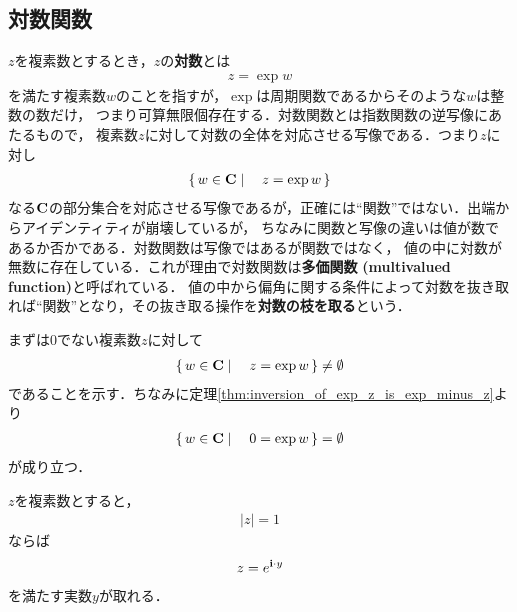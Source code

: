 \subsection{対数関数}
	
	$z$を複素数とするとき，$z$の{\bf 対数}とは
	\begin{align}
		z = \exp{w}
	\end{align}
	を満たす複素数$w$のことを指すが，$\exp$は周期関数であるからそのような$w$は整数の数だけ，
	つまり可算無限個存在する．対数関数とは指数関数の逆写像にあたるもので，
	複素数$z$に対して対数の全体を対応させる写像である．つまり$z$に対し
	\begin{align}
		\left\{\, w \in \mathbf{C} \mid \quad z = \exp{w}\, \right\}
	\end{align}
	なる$\mathbf{C}$の部分集合を対応させる写像であるが，正確には``関数''ではない．出端からアイデンティティが崩壊しているが，
	ちなみに関数と写像の違いは値が数であるか否かである．対数関数は写像ではあるが関数ではなく，
	値の中に対数が無数に存在している．これが理由で対数関数は{\bf 多価関数}
	{\bf (multivalued function)}と呼ばれている．
	値の中から偏角に関する条件によって対数を抜き取れば``関数''となり，その抜き取る操作を{\bf 対数の枝を取る}という．
	
	まずは$0$でない複素数$z$に対して
	\begin{align}
		\left\{\, w \in \mathbf{C} \mid \quad z = \exp{w}\, \right\} \neq \emptyset
	\end{align}
	であることを示す．ちなみに定理\ref{thm:inversion_of_exp_z_is_exp_minus_z}より
	\begin{align}
		\left\{\, w \in \mathbf{C} \mid \quad 0 = \exp{w}\, \right\} = \emptyset
	\end{align}
	が成り立つ．
	
	\begin{screen}
		\begin{thm}
		\label{thm:complex_number_with_absolute_value_1_is_exp_pure_imaginary}
			$z$を複素数とすると，
			\begin{align}
				|z| = 1
			\end{align}
			ならば
			\begin{align}
				z = e^{\mathbf{i} \cdot y}
			\end{align}
			を満たす実数$y$が取れる．
		\end{thm}
	\end{screen}
	

